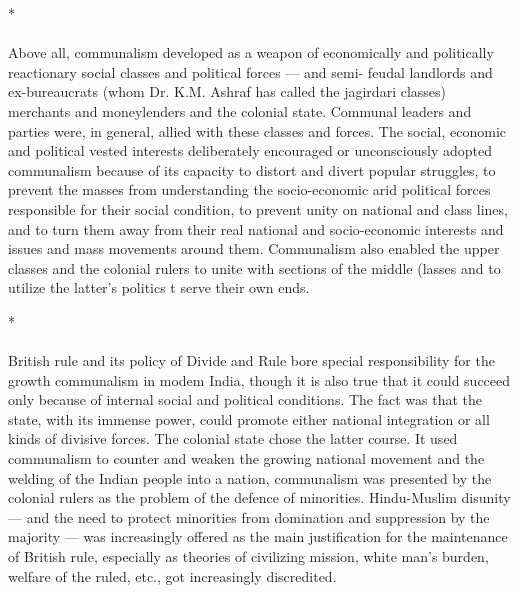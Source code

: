 \begin{center}*\end{center}

\paragraph*{}


Above all, communalism developed as a weapon of economically and politically reactionary social classes and political forces — and semi- feudal landlords and ex-bureaucrats (whom Dr. K.M. Ashraf has called the jagirdari classes) merchants and moneylenders and the colonial state. Communal leaders and parties were, in general, allied with these classes and forces. The social, economic and political vested interests deliberately encouraged or unconsciously adopted communalism because of its capacity to distort and divert popular struggles, to prevent the masses from understanding the socio-economic arid political forces responsible for their social condition, to prevent unity on national and class lines, and to turn them away from their real national and socio-economic interests and issues and mass movements around them. Communalism also enabled the upper classes and the colonial rulers to unite with sections of the middle (lasses and to utilize the latter's politics t serve their own ends.

\begin{center}*\end{center}

\paragraph*{}


British rule and its policy of Divide and Rule bore special responsibility for the growth communalism in modem India, though it is also true that it could succeed only because of internal social and political conditions. The fact was that the state, with its immense power, could promote either national integration or all kinds of divisive forces. The colonial state chose the latter course. It used communalism to counter and weaken the growing national movement and the welding of the Indian people into a nation, communalism was presented by the colonial rulers as the problem of the defence of minorities. Hindu-Muslim disunity — and the need to protect minorities from domination and suppression by the majority — was increasingly offered as the main justification for the maintenance of British rule, especially as theories of civilizing mission, white man's burden, welfare of the ruled, etc., got increasingly discredited. 

